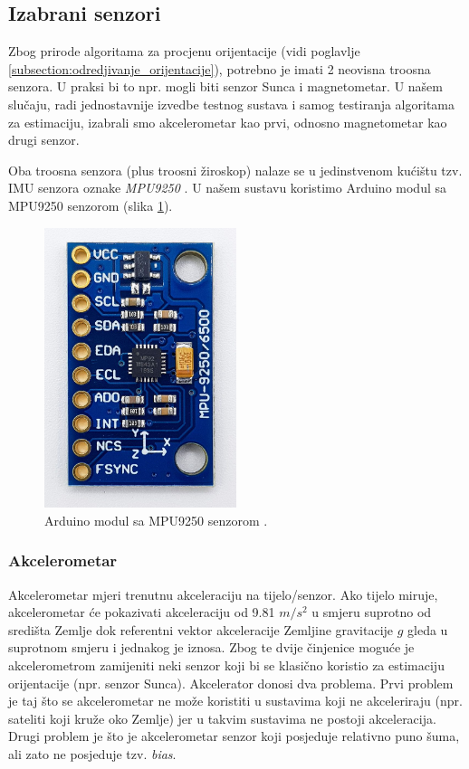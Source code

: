 \documentclass[times, utf8, diplomski, numeric]{templates/template}
\begin{document}
{{        \subsection{Izabrani senzori}{
            Zbog prirode algoritama za procjenu orijentacije (vidi poglavlje \ref{subsection:odredjivanje_orijentacije}), potrebno je imati 2 neovisna troosna senzora. U praksi bi to npr. mogli biti senzor Sunca i magnetometar. U našem slučaju, radi jednostavnije izvedbe testnog sustava i samog testiranja algoritama za estimaciju, izabrali smo akcelerometar kao prvi, odnosno magnetometar kao drugi senzor. 

            Oba troosna senzora (plus troosni žiroskop) nalaze se u jedinstvenom kućištu tzv. IMU  senzora oznake \emph{MPU9250} \cite{mpu9250_datasheet}. U našem sustavu koristimo Arduino modul sa MPU9250 senzorom (slika \ref{fig:mpu9250}).

            \begin{figure}[htb]
            \centering
            \includegraphics[width=0.5\textwidth]{images/mpu9250.jpg}
            \caption{Arduino modul sa MPU9250 senzorom \cite{wolles_mpu9250}.}
            \label{fig:mpu9250}
            \end{figure}

            \subsubsection{Akcelerometar}{
                Akcelerometar mjeri trenutnu akceleraciju na tijelo/senzor. Ako tijelo miruje, akcelerometar će pokazivati akceleraciju od 9.81 $m/s^2$ u smjeru suprotno od središta Zemlje dok referentni vektor akceleracije Zemljine gravitacije $g$ gleda u suprotnom smjeru i jednakog je iznosa. Zbog te dvije činjenice moguće je akcelerometrom zamijeniti neki senzor koji bi se klasično koristio za estimaciju orijentacije (npr. senzor Sunca). Akcelerator donosi dva problema. Prvi problem je taj što se akcelerometar ne može koristiti u sustavima koji ne akceleriraju (npr. sateliti koji kruže oko Zemlje) jer u takvim sustavima ne postoji akceleracija. Drugi problem je što je akcelerometar senzor koji posjeduje relativno puno šuma, ali zato ne posjeduje tzv. \emph{bias}. 

}}}}
\end{document}
